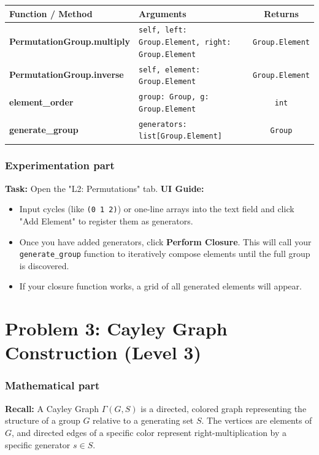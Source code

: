 \documentclass[11pt]{article}
\begin{document}
\begin{center}
\renewcommand{\arraystretch}{1.5}
\begin{tabularx}{\textwidth}{@{} >{\bfseries}l X c @{}}
\toprule
Function / Method & Arguments & Returns \\ \midrule
PermutationGroup.multiply & \lstinline|self, left: Group.Element, right: Group.Element| & \lstinline|Group.Element| \\
PermutationGroup.inverse & \lstinline|self, element: Group.Element| & \lstinline|Group.Element| \\
element\_order & \lstinline|group: Group, g: Group.Element| & \lstinline|int| \\
generate\_group & \lstinline|generators: list[Group.Element]| & \lstinline|Group| \\
\bottomrule
\end{tabularx}
\end{center}

\subsubsection*{Experimentation part}
\textbf{Task:} Open the "L2: Permutations" tab. 
\textbf{UI Guide:} 
\begin{itemize}
    \item Input cycles (like \lstinline|(0 1 2)|) or one-line arrays into the text field and click "Add Element" to register them as generators.
    \item Once you have added generators, click \textbf{Perform Closure}. This will call your \lstinline|generate_group| function to iteratively compose elements until the full group is discovered. 
    \item If your closure function works, a grid of all generated elements will appear. 
\end{itemize}


\section*{Problem 3: Cayley Graph Construction (Level 3)}

\subsubsection*{Mathematical part}
\textbf{Recall:} A Cayley Graph $\Gamma(G, S)$ is a directed, colored graph representing the structure of a group $G$ relative to a generating set $S$. The vertices are elements of $G$, and directed edges of a specific color represent right-multiplication by a specific generator $s \in S$. 
\end{document}
